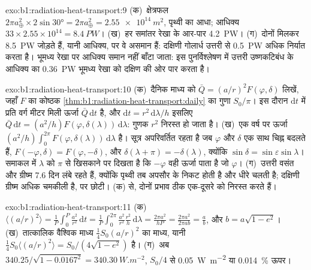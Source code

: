 \begin{solution}{exo:b1:radiation-heat-transport:9}
(क)~क्षेत्रफल $2\pi a_\oplus^2 \times 2\sin\ang{30} = 2\pi a_\oplus^2 =
\qty{2.55e14}{m^2}$, पृथ्वी का आधा; आधिक्य $33 \times 2.55\times10^{14} =
\qty{8.4}{PW}$। (ख)~हर समांतर रेखा के आर-पार \qty{4.2}{PW}। (ग)~दोनों मिलकर \qty{8.5}{PW} जोड़ते हैं, यानी आधिक्य, पर वे असमान हैं: दक्षिणी गोलार्ध उत्तरी से \qty{0.5}{PW} अधिक निर्यात करता है। भूमध्य रेखा पर आधिक्य समान नहीं बाँटा जाता: इस पुनर्विश्लेषण में उत्तरी उष्णकटिबंध के आधिक्य का \qty{0.36}{PW} भूमध्य रेखा को दक्षिण की ओर पार करता है।
\end{solution}

\begin{solution}{exo:b1:radiation-heat-transport:10}
(क)~दैनिक माध्य को $\bar Q = (a/r)^2 F(\varphi, \delta)$ लिखें, जहाँ $F$ का
कोष्ठक \cref{thm:b1:radiation-heat-transport:daily} का गुणा $S_0/\pi$। इस दौरान
$\mathrm dt$ में प्रति वर्ग मीटर मिली ऊर्जा $\bar Q\,\mathrm dt$ है, और
$\mathrm dt = r^2\,\mathrm d\lambda/h$ इसलिए $\bar Q\,\mathrm dt = (a^2/h)
F(\varphi, \delta(\lambda))\,\mathrm d\lambda$: गुणक $r^2$ निरस्त हो जाता है।
(ख)~एक वर्ष पर ऊर्जा $(a^2/h)\int_0^{2\pi} F(\varphi,
\delta(\lambda))\,\mathrm d\lambda$ है। सूत्र अपरिवर्तित रहता है जब $\varphi$ और
$\delta$ एक साथ चिह्न बदलते हैं, $F(-\varphi, \delta) = F(\varphi, -\delta)$, और
$\delta(\lambda + \pi) = -\delta(\lambda)$, क्योंकि $\sin\delta = \sin\varepsilon
\sin\lambda$। समाकल में $\lambda$ को $\pi$ से खिसकाने पर दिखता है कि $-\varphi$
वही ऊर्जा पाता है जो $\varphi$। (ग)~उत्तरी वसंत और ग्रीष्म
\num{7.6} दिन लंबे रहते हैं, क्योंकि पृथ्वी तब अपसौर के निकट होती है और धीरे चलती है; दक्षिणी ग्रीष्म अधिक चमकीली है, पर छोटी।
(क) से, दोनों प्रभाव ठीक एक-दूसरे को निरस्त करते हैं।
\end{solution}

\begin{solution}{exo:b1:radiation-heat-transport:11}
(क)~$\langle (a/r)^2\rangle = \frac1P\int_0^P \frac{a^2}{r^2}\,\mathrm dt =
\frac1P\int_0^{2\pi}\frac{a^2}{r^2}\frac{r^2}{h}\,\mathrm d\lambda = \frac{2\pi
a^2}{hP} = \frac{2\pi a^2}{2\pi a b} = \frac ab$, और $b = a\sqrt{1-e^2}$।
(ख)~तात्कालिक वैश्विक माध्य $\frac14 S_0(a/r)^2$ का माध्य, यानी $\frac14 S_0
\langle(a/r)^2\rangle = S_0/(4\sqrt{1-e^2})$ है। (ग)~अब $340.25/\sqrt{1 - 0.0167^2} =
\qty{340.30}{W.m^{-2}}$, $S_0/4$ से \qty{0.05}{W.m^{-2}} या \qty{0.014}{\percent} ऊपर।
\end{solution}

